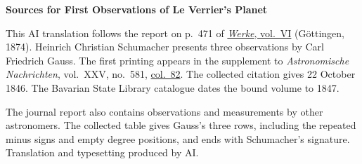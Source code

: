 \clearpage\thispagestyle{empty}
\begin{center}\textbf{Sources for First Observations of Le Verrier’s Planet}\end{center}
\noindent This AI translation follows the report on p.~471 of \href{https://gdz.sub.uni-goettingen.de/id/PPN236007467}{\textit{Werke}, vol.~VI} (Göttingen, 1874). Heinrich Christian Schumacher presents three observations by Carl Friedrich Gauss. The first printing appears in the supplement to \textit{Astronomische Nachrichten}, vol.~XXV, no.~581, \href{https://api.digitale-sammlungen.de/iiif/image/v2/bsb10049450_00049/full/1800,/0/default.jpg}{col.~82}. The collected citation gives 22 October 1846. The Bavarian State Library catalogue dates the bound volume to 1847.
\par\smallskip\noindent The journal report also contains observations and measurements by other astronomers. The collected table gives Gauss’s three rows, including the repeated minus signs and empty degree positions, and ends with Schumacher’s signature. Translation and typesetting produced by AI.
\clearpage
